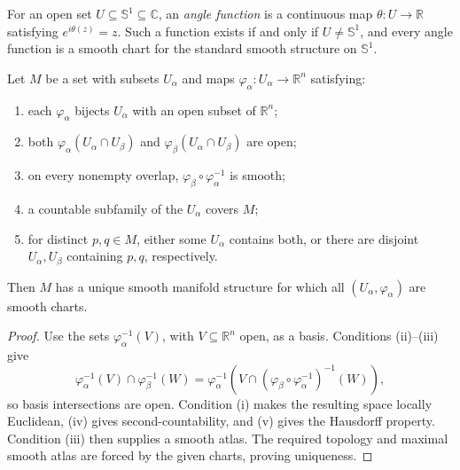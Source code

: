 \begin{proposition}
\label{prob:1-8}
\leanok
For an open set $U\subseteq\mathbb S^1\subseteq\mathbb C$, an
\emph{angle function} is a continuous map $\theta:U\to\mathbb R$ satisfying
$e^{i\theta(z)}=z$. Such a function exists if and only if
$U\neq\mathbb S^1$, and every angle function is a smooth chart for the
standard smooth structure on $\mathbb S^1$.
\end{proposition}

\begin{lemma}
\label{lem:1-35}
\leanok
{}
Let $M$ be a set with subsets $U_\alpha$ and maps
$\varphi_\alpha:U_\alpha\to\mathbb R^n$ satisfying:
\begin{enumerate}
\item each $\varphi_\alpha$ bijects $U_\alpha$ with an open subset of
$\mathbb R^n$;
\item both $\varphi_\alpha(U_\alpha\cap U_\beta)$ and
$\varphi_\beta(U_\alpha\cap U_\beta)$ are open;
\item on every nonempty overlap,
$\varphi_\beta\circ\varphi_\alpha^{-1}$ is smooth;
\item a countable subfamily of the $U_\alpha$ covers $M$;
\item for distinct $p,q\in M$, either some $U_\alpha$ contains both, or there
are disjoint $U_\alpha,U_\beta$ containing $p,q$, respectively.
\end{enumerate}
Then $M$ has a unique smooth manifold structure for which all
$(U_\alpha,\varphi_\alpha)$ are smooth charts.
\end{lemma}

\begin{proof}
\leanok
\sketch Use the sets $\varphi_\alpha^{-1}(V)$, with
$V\subseteq\mathbb R^n$ open, as a basis. Conditions (ii)--(iii) give
\[
\varphi_\alpha^{-1}(V)\cap\varphi_\beta^{-1}(W)
=\varphi_\alpha^{-1}\!\left(
V\cap(\varphi_\beta\circ\varphi_\alpha^{-1})^{-1}(W)\right),
\]
so basis intersections are open. Condition (i) makes the resulting space
locally Euclidean, (iv) gives second-countability, and (v) gives the Hausdorff
property. Condition (iii) then supplies a smooth atlas. The required topology
and maximal smooth atlas are forced by the given charts, proving uniqueness.
\end{proof}

